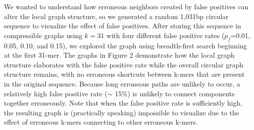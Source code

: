 \documentclass[12pt]{article} \usepackage{simplemargins}
\begin{document}
We wanted to understand how erroneous neighbors created by false
positives can alter the local graph structure, so we 
generated a random 1,031bp circular sequence to visualize the effect of false
positives.  After storing this sequence in compressible graphs using
$k=31$ with four different false positive rates ($p_f$=0.01, 0.05,
0.10, and 0.15), we explored the graph using breadth-first search
beginning at the first 31-mer.  The graphs in Figure 2 demonstrate how
the local graph structure elaborates with the false positive rate
while the overall circular graph structure remains, with no erroneous
shortcuts between k-mers that are present in the original
sequence. Because long erroneous paths are unlikely to occur, a
relatively high false positive rate ($\sim$ 15\%) is unlikely to
connect components together erroneously. Note that when the false
positive rate is sufficiently high, the resulting graph is
(practically speaking) impossible to visualize due to the effect of
erroneous k-mers connecting to other erroneous k-mers.

\end{document}
